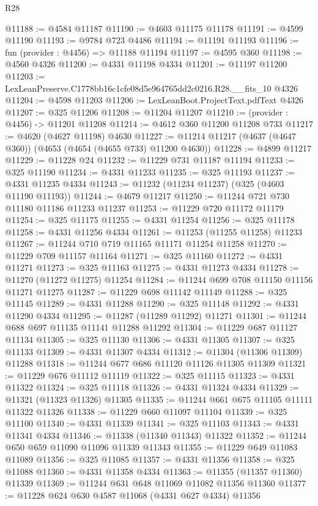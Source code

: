 \begin{lexlean}{R28}
\begin{coremodule}
@11188 := @4584 @11187
@11190 := @4603 @11175 @11178
@11191 := @4599 @11190
@11193 := @9784 @723 @4486
@11194 := @11191 @11193
@11196 := fun (provider : @4456) => @11188 @11194
@11197 := @4595 @360
@11198 := @4560 @4326
@11200 := @4331 @11198 @4334
@11201 := @11197 @11200
@11203 := LexLeanPreserve.C1778bb16c1cfe08d5e964765dd2c0216.R28.__fits_10 @4326
@11204 := @4598 @11203
@11206 := LexLeanBoot.ProjectText.pdfText @4326
@11207 := @325 @11206
@11208 := @11204 @11207
@11210 := (provider : @4456) -> @11201 @11208
@11214 := @4612 @360 @11200 @11208 @733
@11217 := @4620 (@4627 @11198) @4630
@11227 := @11214 @11217 (@4637 (@4647 @360)) (@4653 (@4654 (@4655 @733) @11200 @4630))
@11228 := @4899 @11217
@11229 := @11228 @24
@11232 := @11229 @731 @11187 @11194
@11233 := @325 @11190
@11234 := @4331 @11233
@11235 := @325 @11193
@11237 := @4331 @11235 @4334
@11243 := @11232 (@11234 @11237) (@325 (@4603 @11190 @11193))
@11244 := @4679 @11217
@11250 := @11244 @721 @730 @11180 @11186 @11233 @11237
@11253 := @11229 @720 @11172 @11179
@11254 := @325 @11175
@11255 := @4331 @11254
@11256 := @325 @11178
@11258 := @4331 @11256 @4334
@11261 := @11253 (@11255 @11258) @11233
@11267 := @11244 @710 @719 @11165 @11171 @11254 @11258
@11270 := @11229 @709 @11157 @11164
@11271 := @325 @11160
@11272 := @4331 @11271
@11273 := @325 @11163
@11275 := @4331 @11273 @4334
@11278 := @11270 (@11272 @11275) @11254
@11284 := @11244 @699 @708 @11150 @11156 @11271 @11275
@11287 := @11229 @698 @11142 @11149
@11288 := @325 @11145
@11289 := @4331 @11288
@11290 := @325 @11148
@11292 := @4331 @11290 @4334
@11295 := @11287 (@11289 @11292) @11271
@11301 := @11244 @688 @697 @11135 @11141 @11288 @11292
@11304 := @11229 @687 @11127 @11134
@11305 := @325 @11130
@11306 := @4331 @11305
@11307 := @325 @11133
@11309 := @4331 @11307 @4334
@11312 := @11304 (@11306 @11309) @11288
@11318 := @11244 @677 @686 @11120 @11126 @11305 @11309
@11321 := @11229 @676 @11112 @11119
@11322 := @325 @11115
@11323 := @4331 @11322
@11324 := @325 @11118
@11326 := @4331 @11324 @4334
@11329 := @11321 (@11323 @11326) @11305
@11335 := @11244 @661 @675 @11105 @11111 @11322 @11326
@11338 := @11229 @660 @11097 @11104
@11339 := @325 @11100
@11340 := @4331 @11339
@11341 := @325 @11103
@11343 := @4331 @11341 @4334
@11346 := @11338 (@11340 @11343) @11322
@11352 := @11244 @650 @659 @11090 @11096 @11339 @11343
@11355 := @11229 @649 @11083 @11089
@11356 := @325 @11085
@11357 := @4331 @11356
@11358 := @325 @11088
@11360 := @4331 @11358 @4334
@11363 := @11355 (@11357 @11360) @11339
@11369 := @11244 @631 @648 @11069 @11082 @11356 @11360
@11377 := @11228 @624 @630 @4587 @11068 (@4331 @627 @4334) @11356

\end{coremodule}
\end{lexlean}

